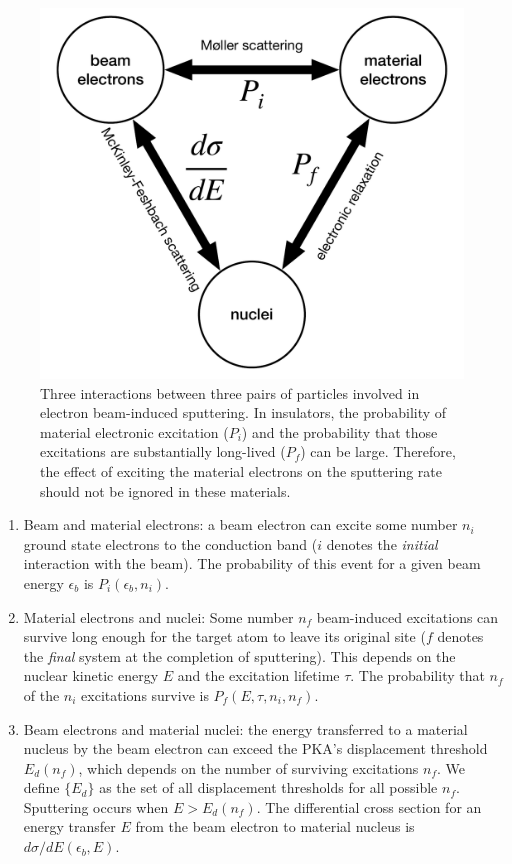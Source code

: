 \documentclass{article}
\begin{document}
\begin{figure}
  \centering
  \includegraphics[width=.7\textwidth]{figures/triad.pdf}
  \caption{
    Three interactions between three pairs of particles involved in electron
    beam-induced sputtering.
    In insulators, the probability of material electronic excitation ($P_i$)
    and the probability that those excitations are substantially long-lived
    ($P_f$) can be large.
    Therefore, the effect of exciting the material electrons on the sputtering
    rate should not be ignored in these materials.
  }
  \label{fig:triad}
\end{figure}

\begin{enumerate}
  \item Beam and material electrons:
    a beam electron can excite some number $n_i$ ground state electrons to the
    conduction band ($i$ denotes the \textit{initial} interaction with the
    beam).
    The probability of this event for a given beam energy $\epsilon_b$ is
    $P_i(\epsilon_b, n_i)$.
  \item Material electrons and nuclei:
    Some number $n_f$ beam-induced excitations can survive long enough for the
    target atom to leave its original site ($f$ denotes the \textit{final}
    system at the completion of sputtering).
    This depends on the nuclear kinetic energy $E$ and the excitation lifetime
    $\tau$.
    The probability that $n_f$ of the $n_i$ excitations survive is $P_f(E,
    \tau, n_i, n_f)$.
  \item Beam electrons and material nuclei: the energy transferred to a
    material nucleus by the beam electron can exceed the PKA's displacement
    threshold $E_d(n_f)$, which depends on the number of surviving excitations
    $n_f$.  We define $\{{E}_d\}$ as the set of all displacement thresholds for
    all possible $n_f$.  Sputtering occurs when $E>E_d(n_f)$.  The differential
    cross section for an energy transfer $E$ from the beam electron to
    material nucleus is $d\sigma/dE(\epsilon_b, E)$.
\end{enumerate}
\end{document}
